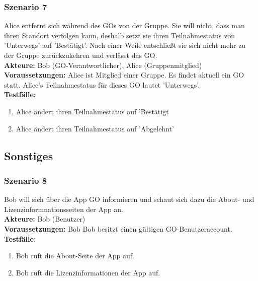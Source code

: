 \documentclass[parskip=full]{scrartcl}
\def\threedigits#1{%
  \ifnum#1<100 0\fi
  \ifnum#1<10 0\fi
  \number#1}
\begin{document}
\subsubsection*{Szenario 7}Alice entfernt sich während des GOs von der Gruppe. Sie will nicht, dass man ihren Standort verfolgen kann, deshalb setzt sie ihren Teilnahmestatus von 'Unterwegs' auf 'Bestätigt'. Nach einer Weile entschließt sie sich nicht mehr zu der Gruppe zurückzukehren und verlässt das GO.\\

\textbf{Akteure:} Bob (GO-Verantwortlicher), Alice (Gruppenmitglied)\\

\textbf{Voraussetzungen: }Alice ist Mitglied einer Gruppe. Es findet aktuell ein GO statt. Alice's Teilnahmestatus für dieses GO lautet 'Unterwegs'.\\

\textbf{Testfälle:}
\begin{enumerate}[label={\textbf{/T\protect\threedigits{\theenumi}0/}}, leftmargin=*, resume]
	\item Alice ändert ihren Teilnahmestatus auf 'Bestätigt
	\item Alice ändert ihren Teilnahmestatus auf 'Abgelehnt'
\end{enumerate}

\subsection{Sonstiges}

\subsubsection*{Szenario 8} Bob will sich über die App GO informieren und schaut sich dazu die About- und Lizenzinformnationsseiten der App an.\\

\textbf{Akteure: }Bob (Benutzer)\\

\textbf{Voraussetzungen: }Bob Bob besitzt einen gültigen GO-Benutzeraccount.\\

\textbf{Testfälle:}\\
\begin{enumerate}[label={\textbf{/T\protect\threedigits{\theenumi}0/}}, leftmargin=*, resume]
	\item Bob ruft die About-Seite der App auf.
	\item Bob ruft die Lizenzinformationen der App auf.
\end{enumerate}
\end{document}
